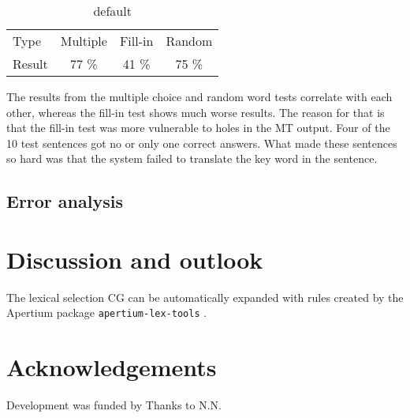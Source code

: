 \begin{table}[htdp]
\caption{default}
\begin{center}
\begin{tabular}{lccc}
Type & Multiple & Fill-in & Random \\
Result & 77 \% & 41 \% & 75 \% \\
\end{tabular}
\end{center}
\label{eval}
\end{table}%



The results from the multiple choice and random word tests correlate with each other, whereas the fill-in test shows much worse results. The reason for that is that the fill-in test was more vulnerable to holes in the MT output. Four of the 10 test sentences got no or only one correct answers. What made these sentences so hard was that the system failed to translate the key word in the sentence.







\subsection{Error analysis}

\section{Discussion and outlook}

The lexical selection CG can be automatically expanded with rules
created by the Apertium package \texttt{apertium-lex-tools}
\citep{???}.

\section*{Acknowledgements}
Development was funded by 
Thanks to N.N.


\nocite{zubizarreta2009amt}
